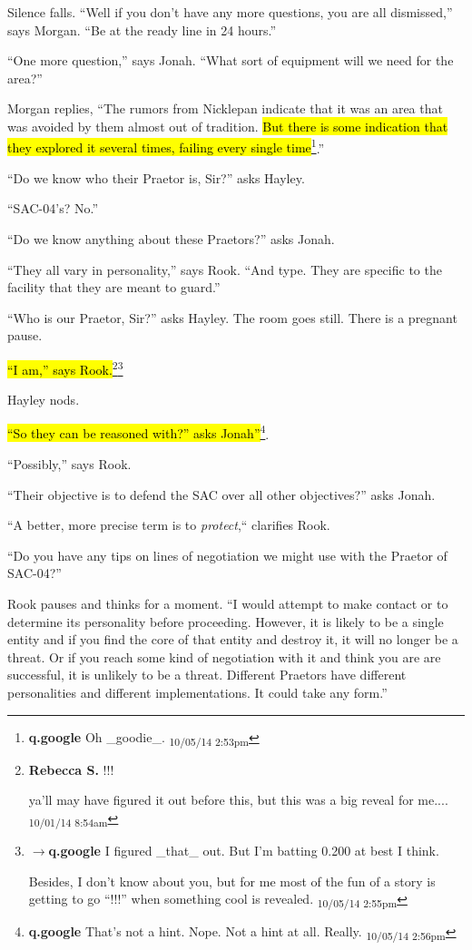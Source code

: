 Silence falls.  ``Well if you don't have any more questions, you are all dismissed,'' says Morgan.  ``Be at the ready line in 24 hours.''

``One more question,'' says Jonah.  ``What sort of equipment will we need for the area?''

Morgan replies, ``The rumors from Nicklepan indicate that it was an area that was avoided by them almost out of tradition.  \hl{But there is some indication that they explored it several times, failing every single time}\footnote{\textbf{q.google }Oh \_goodie\_. \textsubscript{10/05/14 2:53pm}}.'' 

``Do we know who their Praetor is, Sir?'' asks Hayley.

``SAC-04's?  No.''

``Do we know anything about these Praetors?'' asks Jonah.

``They all vary in personality,'' says Rook. ``And type.  They are specific to the facility that they are meant to guard.''

``Who is our Praetor, Sir?'' asks Hayley.  The room goes still. There is a pregnant pause.

\hl{``I am,'' says Rook.}\footnote{\textbf{Rebecca S. }!!!

ya'll may have figured it out before this, but this was a big reveal for me.... \textsubscript{10/01/14 8:54am}}\footnote{$\rightarrow$\textbf{q.google }I figured \_that\_ out.  But I'm batting 0.200 at best I think.

Besides, I don't know about you, but for me most of the fun of a story is getting to go ``!!!'' when something cool is revealed. \textsubscript{10/05/14 2:55pm}}

Hayley nods.

\hl{``So they can be reasoned with?'' asks Jonah''}\footnote{\textbf{q.google }That's not a hint.  Nope.  Not a hint at all.  Really. \textsubscript{10/05/14 2:56pm}}.  

``Possibly,'' says Rook.

``Their objective is to defend the SAC over all other objectives?'' asks Jonah.

``A better, more precise term is to \textit{protect},`` clarifies Rook.

``Do you have any tips on lines of negotiation we might use with the Praetor of SAC-04?''

Rook pauses and thinks for a moment.  ``I would attempt to make contact or to determine its personality before proceeding.  However, it is likely to be a single entity and if you find the core of that entity and destroy it, it will no longer be a threat.  Or if you reach some kind of negotiation with it and think you are are successful, it is unlikely to be a threat.  Different Praetors have different personalities and different implementations.  It could take any form.''

